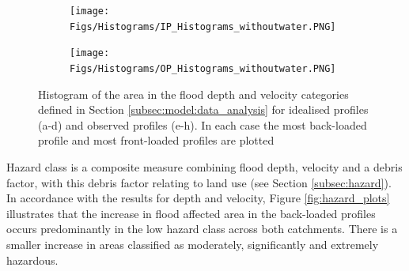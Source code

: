 \documentclass[APA,Times2COL]{WileyNJDv5}
\begin{document}
\begin{figure}[!t] 
\begin{subfigure}[H]{\linewidth}
\texttt{[image: Figs/Histograms/IP\_Histograms\_withoutwater.PNG]}
\end{subfigure}
\begin{subfigure}[H]{\linewidth}
\texttt{[image: Figs/Histograms/OP\_Histograms\_withoutwater.PNG]}
\end{subfigure}
\caption{Histogram of the area in the flood depth and velocity categories defined in Section \ref{subsec:model:data_analysis} for idealised profiles (a-d) and observed profiles (e-h). In each case the most back-loaded profile and most front-loaded profiles are plotted} \label{fig:histograms} 
\end{figure}

Hazard class is a composite measure combining flood depth, velocity and a debris factor, with this debris factor relating to land use (see Section \ref{subsec:hazard}). In accordance with the results for depth and velocity, Figure \ref{fig:hazard_plots} illustrates that the increase in flood affected area in the back-loaded profiles occurs predominantly in the low hazard class across both catchments. There is a smaller increase in areas classified as moderately, significantly and extremely hazardous.
\end{document}
